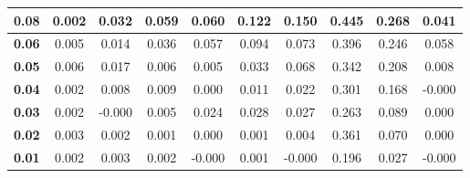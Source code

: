 \begin{table}[H]
{\begin{tabular}{c|c|c|c|c|c|c|c|c|c}
 \bf 0.08&0.002 & 0.032 & 0.059 & 0.060 & 0.122 & 0.150 & 0.445 & 0.268 & 0.041 \\ \hline 
 \bf 0.06&0.005 & 0.014 & 0.036 & 0.057 & 0.094 & 0.073 & 0.396 & 0.246 & 0.058 \\ \hline 
 \bf 0.05&0.006 & 0.017 & 0.006 & 0.005 & 0.033 & 0.068 & 0.342 & 0.208 & 0.008 \\ \hline 
 \bf 0.04&0.002 & 0.008 & 0.009 & 0.000 & 0.011 & 0.022 & 0.301 & 0.168 & -0.000 \\ \hline 
 \bf 0.03&0.002 & -0.000 & 0.005 & 0.024 & 0.028 & 0.027 & 0.263 & 0.089 & 0.000 \\ \hline 
 \bf 0.02&0.003 & 0.002 & 0.001 & 0.000 & 0.001 & 0.004 & 0.361 & 0.070 & 0.000 \\ \hline 
 \bf 0.01&0.002 & 0.003 & 0.002 & -0.000 & 0.001 & -0.000 & 0.196 & 0.027 & -0.000 \\ \hline 
\end{tabular}}
\label{method_improvement}
\end{table}
